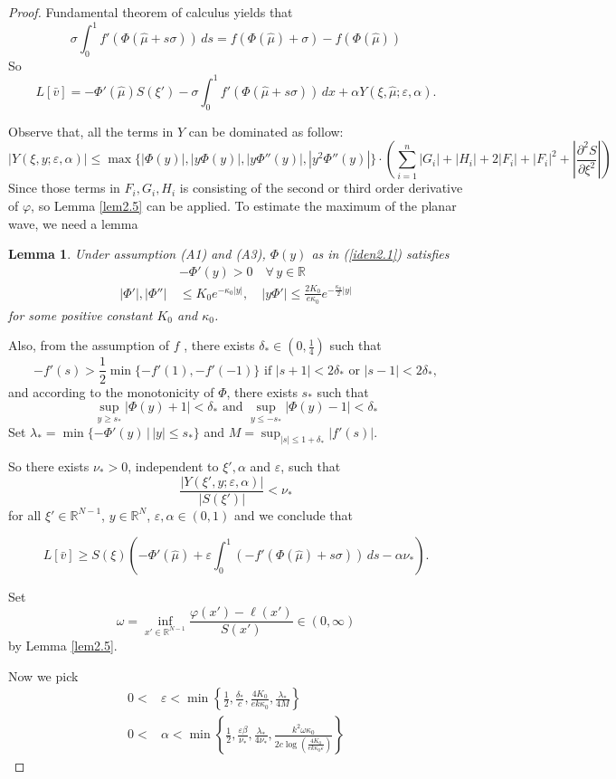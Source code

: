 \documentclass[12pt, a4paper]{article}
\newtheorem{lemma}[thm]{Lemma}
\numberwithin{equation}{section}
\newcommand{\R}{\mathbb{R}}
\newcommand{\hmu}{\hat{\mu}}
\newcommand{\pdd}[2]{\frac{\partial^2 #1}{\partial #2^2}}
\begin{document}
\begin{CJK}{UTF8}{bkai}
\begin{proof}
Fundamental theorem of calculus yields that 
\[
	\sigma\int_0^1f'(\Phi(\hmu+s\sigma))\,ds=f(\Phi(\hmu)+\sigma)-f(\Phi(\hmu))
\]
So
\[
	L[\bar{v}]=-\Phi'(\hmu)S(\xi')-\sigma\int_0^1f'(\Phi(\hmu+s\sigma))\,dx+\alpha Y(\xi,\hmu;\varepsilon,\alpha).
\]

Observe that, all the terms in $Y$ can be dominated as follow:
\[
	|Y(\xi,y;\varepsilon,\alpha)|\leq \max\{|\Phi(y)|,|y\Phi(y)|,|y\Phi''(y)|,|y^2\Phi''(y)|\}\cdot\left(\sum_{i=1}^n|G_i|+|H_i|+2|F_i|+|F_i|^2+\left|\pdd{S}{\xi}\right|\right)
\]
Since those terms in $F_i,G_i,H_i$ is consisting of the second or third order derivative of $\varphi$, so Lemma \ref{lem2.5} can be applied. To estimate the maximum of the planar wave, we need a lemma

\begin{lemma}\label{lem2.7}
	Under assumption (A1) and (A3), $\Phi(y)$ as in (\ref{iden2.1}) satisfies
\begin{align*}
	&-\Phi'(y)>0\quad\forall\,y\in\R\\
	|\Phi'|,|\Phi''|\,&\leq K_0e^{-\kappa_0|y|},\quad |y\Phi'|\leq\frac{2K_0}{e\kappa_0}e^{-\frac{\kappa_0}{2}|y|}
\end{align*}
for some positive constant $K_0$ and $\kappa_0$.
\end{lemma} 

Also, from the assumption of $f$ , there exists $\delta_*\in(0,\frac{1}{4})$ such that
\[
	-f'(s)>\frac{1}{2}\min\{-f'(1),-f'(-1)\}\mbox{ if }|s+1|<2\delta_*\mbox{ or }|s-1|<2\delta_*,
\] 
and according to the monotonicity of $\Phi$, there exists $s_*$ such that
\[
	\sup_{y\geq s_*}|\Phi(y)+1|<\delta_*\mbox{ and }\sup_{y\leq -s_*}|\Phi(y)-1|<\delta_*
\]
Set $\lambda_*=\min\{-\Phi'(y)\,|\,|y|\leq s_*\}$ and $M=\sup_{|s|\leq 1+\delta_*}|f'(s)|$.

So there exists $\nu_*>0$, independent to $\xi',\alpha$ and $\varepsilon$, such that
\[
	\frac{|Y(\xi',y;\varepsilon,\alpha)|}{|S(\xi')|}<\nu_*
\]
for all $\xi'\in\R^{N-1}$, $y\in\R^N$, $\varepsilon,\alpha\in(0,1)$ and we conclude that

\begin{equation}\label{iden2.20}
	L[\bar{v}]\geq S(\xi)\left(-\Phi'(\hmu)+\varepsilon\int_0^1(-f'(\Phi(\hmu)+s\sigma))\,ds-\alpha\nu_*\right).
\end{equation}

Set
\[
	\omega=\inf_{x'\in\R^{N-1}}\frac{\varphi(x')-\ell(x')}{S(x')}\in(0,\infty)
\]
by Lemma \ref{lem2.5}. 

Now we pick
\begin{align}
	0<&\varepsilon<\min\left\{\frac{1}{2},\frac{\delta_*}{c},\frac{4K_0}{ek\kappa_0},\frac{\lambda_*}{4M}\right\}\\
	0<&\alpha<\min\left\{\frac{1}{2},\frac{\varepsilon\beta}{\nu_*},\frac{\lambda_*}{4\nu_*},\frac{k^2\omega\kappa_0}{2c\log(\frac{4K_0}{ek\kappa_0\varepsilon})}\right\}
\end{align}


\end{proof}
\end{CJK}
\end{document}
